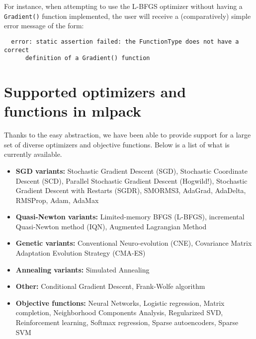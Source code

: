 \documentclass{article}
\begin{document}
For instance, when attempting to use the L-BFGS optimizer without having a
{\tt Gradient()} function implemented, the user will receive a (comparatively)
simple error message of the form:

\vspace*{-0.4em}
{\footnotesize
\begin{verbatim}
  error: static assertion failed: the FunctionType does not have a correct
      definition of a Gradient() function
\end{verbatim}
}
\vspace*{-0.4em}

\section{Supported optimizers and functions in mlpack}

Thanks to the easy abstraction, we have been able to provide support for a large
set of diverse optimizers and objective functions.  Below is a list of what is
currently available.

\vspace*{-0.4em}
\begin{itemize} \itemsep -1pt
  \item {\bf SGD variants:} Stochastic Gradient Descent (SGD), Stochastic
      Coordinate Descent (SCD), Parallel Stochastic Gradient Descent (Hogwild!),
      Stochastic Gradient Descent with Restarts (SGDR), SMORMS3, AdaGrad,
      AdaDelta, RMSProp, Adam, AdaMax

  \item {\bf Quasi-Newton variants:} Limited-memory BFGS (L-BFGS), incremental
        Quasi-Newton method (IQN), Augmented Lagrangian Method

  \item {\bf Genetic variants:} Conventional Neuro-evolution (CNE), Covariance
        Matrix Adaptation Evolution Strategy (CMA-ES)

  \item {\bf Annealing variants:} Simulated Annealing

  \item {\bf Other:} Conditional Gradient Descent, Frank-Wolfe algorithm

  \item {\bf Objective functions:} Neural Networks, Logistic regression,
      Matrix completion, Neighborhood Components Analysis, Regularized SVD,
      Reinforcement learning, Softmax regression, Sparse autoencoders,
      Sparse SVM
\end{itemize}
\vspace*{-0.4em}
\end{document}
